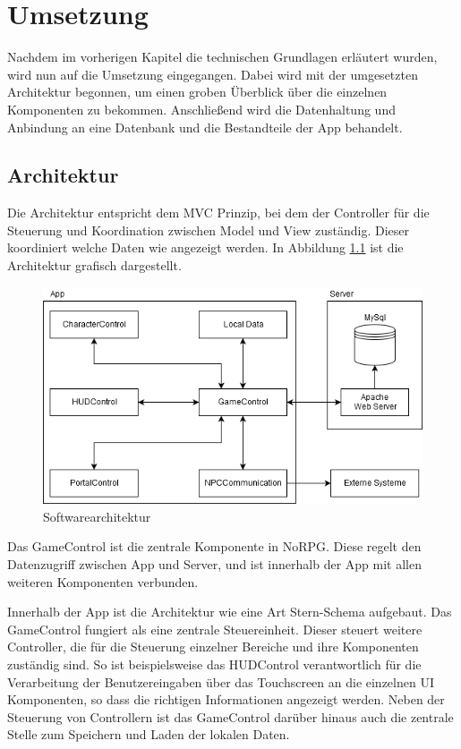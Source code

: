 \chapter{Umsetzung}
	Nachdem im vorherigen Kapitel die technischen Grundlagen erläutert wurden, wird nun auf die Umsetzung eingegangen. Dabei wird mit der umgesetzten Architektur begonnen, um einen groben Überblick über die einzelnen Komponenten zu bekommen. Anschließend wird die Datenhaltung und Anbindung an eine Datenbank und die Bestandteile der App behandelt.

	\section{Architektur}
		Die Architektur entspricht dem \ac{MVC} Prinzip, bei dem der Controller für die Steuerung und Koordination zwischen Model und View zuständig. Dieser koordiniert welche Daten wie angezeigt werden. In Abbildung \ref{architecture} ist die Architektur grafisch dargestellt.

		\begin{figure}[htbp]
			\centering 
			\label{architecture}
			\includegraphics[width=13cm]{pics/archtecture.png}
			\caption{Softwarearchitektur}
		\end{figure}
	
		Das GameControl ist die zentrale Komponente in NoRPG. Diese regelt den Datenzugriff zwischen App und Server, und ist innerhalb der App mit allen weiteren Komponenten verbunden. 
		
		Innerhalb der App ist die Architektur wie eine Art Stern-Schema aufgebaut. Das GameControl fungiert als eine zentrale Steuereinheit. Dieser steuert weitere Controller, die für die Steuerung einzelner Bereiche und ihre Komponenten zuständig sind. So ist beispielsweise das HUDControl verantwortlich für die Verarbeitung der Benutzereingaben über das Touchscreen an die einzelnen UI Komponenten, so dass die richtigen Informationen angezeigt werden. Neben der Steuerung von Controllern ist das GameControl darüber hinaus auch die zentrale Stelle zum Speichern und Laden der lokalen Daten.
		
